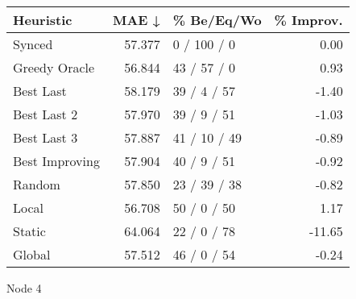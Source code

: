 \begin{tabular}{lrlr}
\toprule
\textbf{Heuristic} & \textbf{MAE ↓} & \textbf{\% Be/Eq/Wo} & \textbf{\% Improv.} \\
\midrule
            Synced &         57.377 &          0 / 100 / 0 &                0.00 \\
     Greedy Oracle &         56.844 &          43 / 57 / 0 &                0.93 \\
         Best Last &         58.179 &          39 / 4 / 57 &               -1.40 \\
       Best Last 2 &         57.970 &          39 / 9 / 51 &               -1.03 \\
       Best Last 3 &         57.887 &         41 / 10 / 49 &               -0.89 \\
    Best Improving &         57.904 &          40 / 9 / 51 &               -0.92 \\
            Random &         57.850 &         23 / 39 / 38 &               -0.82 \\
             Local &         56.708 &          50 / 0 / 50 &                1.17 \\
            Static &         64.064 &          22 / 0 / 78 &              -11.65 \\
            Global &         57.512 &          46 / 0 / 54 &               -0.24 \\
\bottomrule
\end{tabular}
\caption{Node 4}
\label{tab:iid_lr05_le2_bs4_4}
